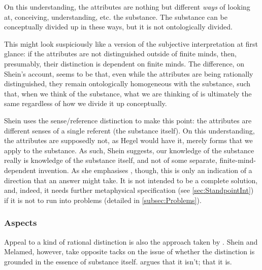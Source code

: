 \documentclass[11pt]{article}
\newcommand{\dash}{\unskip{---}}
\begin{document}
	On this understanding, the attributes are nothing but different \emph{ways} of looking at, conceiving, understanding, etc. the substance. The substance can be conceptually divided up in these ways, but it is not ontologically divided.
	
	This might look suspiciously like a version of the subjective interpretation at first glance: if the attributes are not distinguished outside of finite minds, then, presumably, their distinction is dependent on finite minds. The difference, on Shein's account, seems to be that, even while the attributes are being rationally distinguished, they remain ontologically homogeneous with the substance, such that, when we think of the substance, what we are thinking of is ultimately the same regardless of how we divide it up conceptually.
	
	Shein uses the sense/reference distinction to make this point: the attributes are different senses of a single referent (the substance itself). On this understanding, the attributes are supposedly not, as Hegel would have it, merely forms that we apply to the substance. As such, Shein suggests, our knowledge of the substance really is knowledge of the substance itself, and not of some separate, finite-mind-dependent invention. As she emphasises \parencite*[507]{Shein2009}, though, this is only an indication of a direction that an answer might take. It is not intended to be a complete solution, and, indeed, it needs further metaphysical specification (see \autoref{sec:StandpointInt}) if it is not to run into problems (detailed in \autoref{subsec:Problems}).
	
	
	\subsubsection{Aspects} \label{subsubsec:Aspects}
	
	Appeal to a kind of rational distinction is also the approach taken by \textcite{Melamed2017}. Shein and Melamed, however, take opposite tacks on the issue of whether the distinction is grounded in the essence of substance itself. \Textcite[529]{Shein2009} argues that it isn't; \Textcite[101]{Melamed2017} that it is.
	
\end{document}
